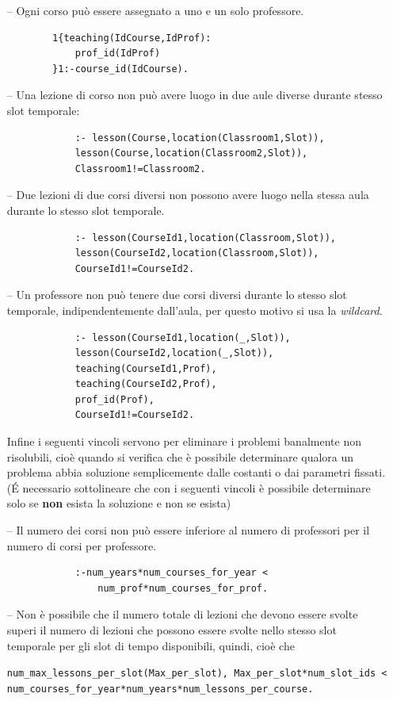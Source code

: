 \documentclass[a4paper,oneside,12pt]{book}
\def \code#1{\texttt{#1}}
\begin{document}
\begin{itemize}[align=left]
        \item [--] Ogni corso può essere assegnato a uno e un solo professore.
        \begin{verbatim}
        1{teaching(IdCourse,IdProf):
            prof_id(IdProf)
        }1:-course_id(IdCourse).
        \end{verbatim}
        \item [--]
        Una lezione di corso non può avere luogo in due aule diverse durante stesso slot temporale:
        \begin{verbatim}
            :- lesson(Course,location(Classroom1,Slot)),
            lesson(Course,location(Classroom2,Slot)),
            Classroom1!=Classroom2.
        \end{verbatim}
        \item [--]
        Due lezioni di due corsi diversi non possono avere luogo nella stessa aula durante lo stesso slot temporale.
        \begin{verbatim}
            :- lesson(CourseId1,location(Classroom,Slot)),
            lesson(CourseId2,location(Classroom,Slot)),
            CourseId1!=CourseId2.
        \end{verbatim}
        \item [--]
        Un professore non può tenere due corsi diversi durante lo stesso slot temporale, indipendentemente dall'aula,
        per questo motivo si usa la \textit{wildcard}.
        \begin{verbatim}
            :- lesson(CourseId1,location(_,Slot)),
            lesson(CourseId2,location(_,Slot)),
            teaching(CourseId1,Prof),
            teaching(CourseId2,Prof),
            prof_id(Prof),
            CourseId1!=CourseId2.
        \end{verbatim}

        Infine i seguenti vincoli servono per eliminare i problemi banalmente non risolubili, cioè quando si verifica
        che è possibile determinare qualora un problema abbia soluzione semplicemente dalle costanti o dai parametri
        fissati. (É necessario sottolineare che con i seguenti vincoli è possibile determinare solo se \textbf{non}
        esista la soluzione e non se esista)
        \item [--]
        Il numero dei corsi non può essere inferiore al numero di professori per il numero di corsi per professore.
        \begin{verbatim}
            :-num_years*num_courses_for_year <
                num_prof*num_courses_for_prof.
        \end{verbatim}
        \item [--]
        Non è possibile che il numero totale di lezioni che devono essere svolte superi il numero di lezioni che
        possono essere svolte nello stesso slot temporale per gli slot di tempo disponibili, quindi,  cioè che
        \begin{center}

            \code{num\_max\_lessons\_per\_slot(Max\_per\_slot), Max\_per\_slot*num\_slot\_ids < num\_courses\_for\_year*num\_years*num\_lessons\_per\_course.}
        \end{center}

    \end{itemize}
\end{document}
